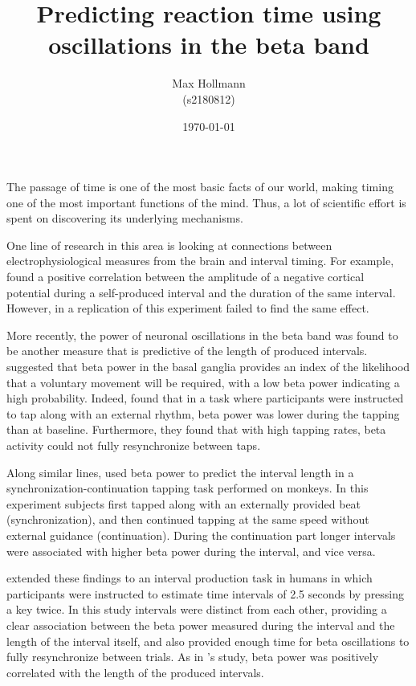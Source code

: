 \documentclass[man,floatsintext]{apa6} %
\title{Predicting reaction time using oscillations in the beta band}
\author{
  Max Hollmann

  (s2180812)
}
\affiliation{
  \vspace{1cm}
  \today
  \vspace{1cm}

  Bachelor Thesis BSc Programme of Psychology

  Faculty of Behavioural and Social Sciences

  University of Groningen

  \vspace{1cm}
  Supervised by: Dr. Hedderik van Rijn

  Secondary evaluator: Udo Boehm

  In collaboration with: Simon Kock, Niklas Fasching, and Robbert van der Mijn
}
\date{\today}
\begin{document}
\maketitle
The passage of time is one of the most basic facts of our world,
making timing one of the most important functions of the mind.  Thus,
a lot of scientific effort is spent on discovering its underlying
mechanisms.

One line of research in this area is looking at connections between
electrophysiological measures from the brain and interval timing.  For
example,  found a positive correlation
between the amplitude of a negative cortical potential during a
self-produced interval and the duration of the same interval.
However, in a replication of this experiment
 failed to find the same effect.

More recently, the power of neuronal oscillations in the beta band was
found to be another measure that is predictive of the length of
produced intervals.  suggested that beta
power in the basal ganglia provides an index of the likelihood that a
voluntary movement will be required, with a low beta power indicating
a high probability.  Indeed,  found that
in a task where participants were instructed to tap along with an
external rhythm, beta power was lower during the tapping than at
baseline. Furthermore, they found that with high tapping rates, beta
activity could not fully resynchronize between
taps.

Along similar lines,  used beta power
to predict the interval length in a synchronization-continuation
tapping task performed on monkeys.  In this experiment subjects first
tapped along with an externally provided beat (synchronization), and
then continued tapping at the same speed without external guidance
(continuation).  During the continuation part longer intervals were
associated with higher beta power during the interval, and vice versa.

 extended these findings to an interval
production task in humans in which participants were instructed to
estimate time intervals of 2.5 seconds by pressing a key twice.  In
this study intervals were distinct from each other, providing a clear
association between the beta power measured during the interval and
the length of the interval itself, and also provided enough time for
beta oscillations to fully resynchronize between trials.  As in
\citeauthor{bartolo_information_2014}'s study, beta power was
positively correlated with the length of the produced intervals.
\end{document}
